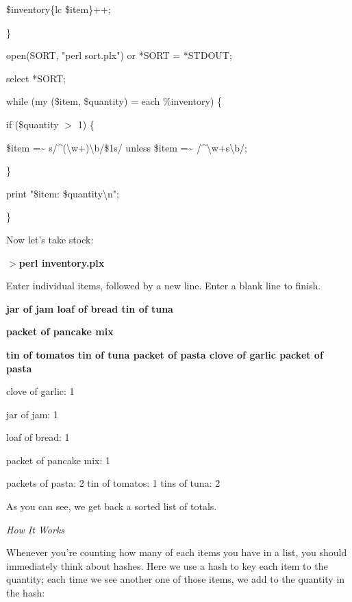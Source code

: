 \documentclass[a4paper,11pt]{book}
\begin{document}
\noindent \$inventory\{lc \$item\}++;

\noindent \}

\noindent 

\noindent open(SORT, "\textbar  perl sort.plx") or *SORT = *STDOUT;

\noindent select *SORT;

\noindent while (my (\$item, \$quantity) = each \%inventory) \{

\noindent if (\$quantity $>$ 1) \{

\noindent \$item =\~{} s/\^{}(\textbackslash w+)\textbackslash b/\$1s/ unless \$item =\~{} /\^{}\textbackslash w+s\textbackslash b/;

\noindent \}

\noindent print "\$item: \$quantity\textbackslash n";

\noindent \}

\noindent 

\noindent 

\noindent Now let's take stock:

\noindent 

\noindent $>$\textbf{perl inventory.plx}

\noindent Enter individual items, followed by a new line. Enter a blank line to finish.

\noindent \textbf{jar of jam loaf of bread tin of tuna}

\noindent \textbf{packet of pancake mix}

\noindent \textbf{tin of tomatos tin of tuna packet of pasta clove of garlic packet of pasta}

\noindent 

\noindent clove of garlic: 1

\noindent jar of jam: 1

\noindent loaf of bread: 1

\noindent packet of pancake mix: 1

\noindent packets of pasta: 2 tin of tomatos: 1 tins of tuna: 2

\noindent 

\noindent As you can see, we get back a sorted list of totals.

\noindent 

\noindent \textit{How It Works}

\noindent Whenever you're counting how many of each items you have in a list, you should immediately think about hashes. Here we use a hash to key each item to the quantity; each time we see another one of those items, we add to the quantity in the hash:
\end{document}

